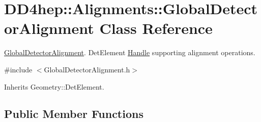 \hypertarget{class_d_d4hep_1_1_alignments_1_1_global_detector_alignment}{
\section{DD4hep::Alignments::GlobalDetectorAlignment Class Reference}
\label{class_d_d4hep_1_1_alignments_1_1_global_detector_alignment}
}


\hyperlink{class_d_d4hep_1_1_alignments_1_1_global_detector_alignment}{GlobalDetectorAlignment}. DetElement \hyperlink{class_d_d4hep_1_1_handle}{Handle} supporting alignment operations.  


{\ttfamily \#include $<$GlobalDetectorAlignment.h$>$}

Inherits Geometry::DetElement.\subsection*{Public Member Functions}
